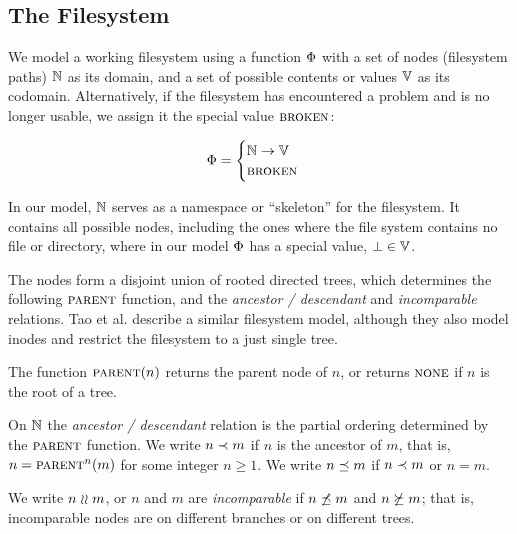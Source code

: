 
\subsection{The Filesystem}

We model a working filesystem
using a function $\Phi$ with a set of nodes (filesystem paths) $\mathbb{N}$ as its domain,
and a set of possible contents or values $\mathbb{V}$ as its codomain.
Alternatively, if the filesystem has encountered a problem and is no longer usable, 
we assign it the special value $\text{\normalfont\scshape{broken}}$:
\begin{mydef}[Filesystem]
\begin{gather*}
\Phi =
\begin{cases}
\mathbb{N} \rightarrow \mathbb{V} \\
\text{\normalfont\scshape{broken}}
\end{cases}
\end{gather*}
\end{mydef}
In our model, $\mathbb{N}$ 
serves as a namespace or ``skeleton'' for the filesystem.
It contains all possible nodes, including the ones 
where the file system contains no file or directory,
where in our model $\Phi$ has a special value, $\bot\in\mathbb{V}$.

The nodes form a disjoint union of rooted directed trees,
which determines the following $\parent$ function,
and the \emph{ancestor / descendant} and \emph{incomparable} relations.
Tao et al. \cite{TSR} describe a similar filesystem model, although
they also model inodes and restrict the filesystem to a just single tree.
\begin{mydef}[$\parent$]
The function $\text{\normalfont\scshape{parent}}(n)$ returns the parent node of $n$, or
returns $\text{\normalfont\scshape{none}}$ if $n$ is the root of a tree.
\end{mydef}

\begin{mydef}[$n\descendant m$]
On $\mathbb{N}$ the \emph{ancestor / descendant} relation is the
partial ordering determined by the $\parent$ function.
We write $n\descendant m$ if $n$ is the ancestor of $m$,
that is, $n=\text{\normalfont\scshape{parent}}^n(m)$ for some integer $n\ge 1$.
We write $n\preceq m$ if $n\descendant m$ or $n=m$.
\end{mydef}

\begin{mydef}[$n\unrel m$]
We write $n\unrel m$, or $n$ and $m$ are \emph{incomparable}
if $n\not\preceq m$ and $n\not\succeq m$;
that is, incomparable nodes are on different branches or on different trees.
\end{mydef}

